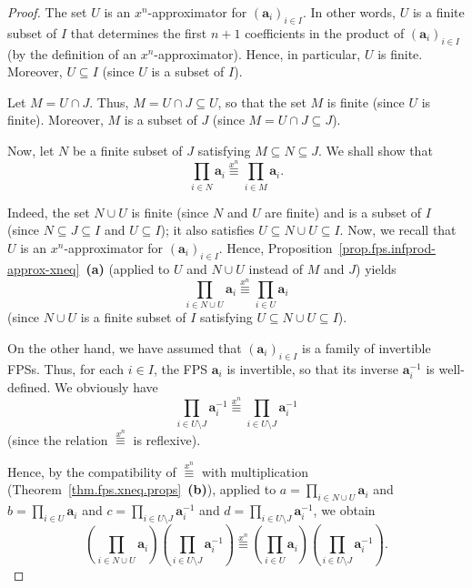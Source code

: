 \begin{proof}
\leanok
The set $U$ is an $x^n$-approximator for
$\left(\mathbf{a}_{i}\right)_{i \in I}$. In other words, $U$ is a
finite subset of $I$ that determines the first $n+1$ coefficients in the
product of $\left(\mathbf{a}_{i}\right)_{i \in I}$ (by the definition
of an $x^n$-approximator). Hence, in particular, $U$ is finite.
Moreover, $U \subseteq I$ (since $U$ is a subset of $I$).

Let $M = U \cap J$. Thus, $M = U \cap J \subseteq U$, so that the set
$M$ is finite (since $U$ is finite). Moreover, $M$ is a subset of $J$
(since $M = U \cap J \subseteq J$).

Now, let $N$ be a finite subset of $J$ satisfying
$M \subseteq N \subseteq J$. We shall show that
\[
\prod_{i \in N} \mathbf{a}_{i} \overset{x^n}{\equiv}
\prod_{i \in M} \mathbf{a}_{i}.
\]

Indeed, the set $N \cup U$ is finite (since $N$ and $U$ are finite) and
is a subset of $I$ (since $N \subseteq J \subseteq I$ and
$U \subseteq I$); it also satisfies $U \subseteq N \cup U \subseteq I$.
Now, we recall that $U$ is an $x^n$-approximator for
$\left(\mathbf{a}_{i}\right)_{i \in I}$. Hence,
Proposition~\ref{prop.fps.infprod-approx-xneq}~\textbf{(a)} (applied to
$U$ and $N \cup U$ instead of $M$ and $J$) yields
\[
\prod_{i \in N \cup U} \mathbf{a}_{i} \overset{x^n}{\equiv}
\prod_{i \in U} \mathbf{a}_{i}
\]
(since $N \cup U$ is a finite subset of $I$ satisfying
$U \subseteq N \cup U \subseteq I$).

On the other hand, we have assumed that
$\left(\mathbf{a}_{i}\right)_{i \in I}$ is a family of invertible FPSs.
Thus, for each $i \in I$, the FPS $\mathbf{a}_{i}$ is invertible, so
that its inverse $\mathbf{a}_{i}^{-1}$ is well-defined. We obviously
have
\[
\prod_{i \in U \setminus J} \mathbf{a}_{i}^{-1}
\overset{x^n}{\equiv}
\prod_{i \in U \setminus J} \mathbf{a}_{i}^{-1}
\]
(since the relation $\overset{x^n}{\equiv}$ is reflexive).

Hence, by the compatibility of $\overset{x^n}{\equiv}$ with
multiplication
(Theorem~\ref{thm.fps.xneq.props}~\textbf{(b)}), applied to
$a = \prod_{i \in N \cup U} \mathbf{a}_{i}$ and
$b = \prod_{i \in U} \mathbf{a}_{i}$ and
$c = \prod_{i \in U \setminus J} \mathbf{a}_{i}^{-1}$ and
$d = \prod_{i \in U \setminus J} \mathbf{a}_{i}^{-1}$, we obtain
\[
\left(\prod_{i \in N \cup U} \mathbf{a}_{i}\right)
\left(\prod_{i \in U \setminus J} \mathbf{a}_{i}^{-1}\right)
\overset{x^n}{\equiv}
\left(\prod_{i \in U} \mathbf{a}_{i}\right)
\left(\prod_{i \in U \setminus J} \mathbf{a}_{i}^{-1}\right).
\]


\end{proof}
